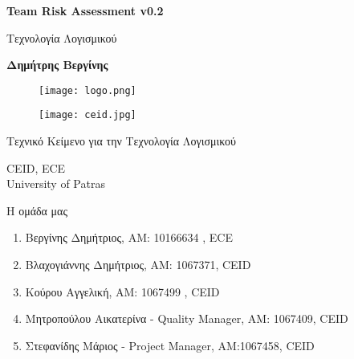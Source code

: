 \documentclass{article}
\begin{document}

\begin{titlepage}
   \begin{center}
       \vspace*{1cm}

       \textbf{\huge Team Risk Assessment v0.2}

       \vspace{0.5cm}
        Τεχνολογία Λογισμικού
            
       \vspace{1cm}

       \textbf{Δημήτρης Βεργίνης}
       
       \begin{figure}[!htb]
        \centering
        \texttt{[image: logo.png]}
        \end{figure}
        
        \vspace{0.5cm}
        
        \begin{figure}[!htb]
        \centering
        \texttt{[image: ceid.jpg]}
        \end{figure}


       \vfill
            
       Τεχνικό Κείμενο για την Τεχνολογία Λογισμικού\\
            
       \vspace{0.5cm}
            
       CEID, ECE\\
       University of Patras\\
            
   \end{center}
\end{titlepage}



\noindent Η ομάδα μας

\begin{enumerate}
  \item Βεργίνης Δημήτριος, ΑΜ: 10166634 , ECE
  \item Βλαχογιάννης Δημήτριος, ΑΜ: 1067371, CEID
  \item Κούρου Αγγελική, ΑΜ: 1067499 , CEID
  \item Μητροπούλου Αικατερίνα - Quality Manager, ΑΜ: 1067409, CEID
  \item Στεφανίδης Μάριος - Project Manager, ΑΜ:1067458, CEID
\end{enumerate}
\end{document}
